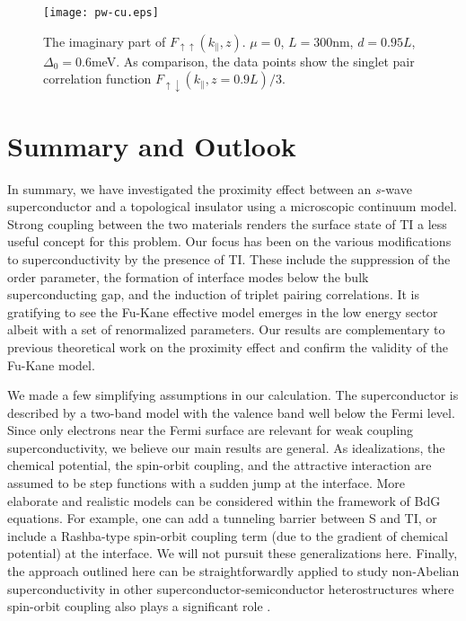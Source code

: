 \documentclass[11pt]{report}
\begin{document}
\begin{figure}
\texttt{[image: pw-cu.eps]}
\caption{The imaginary part of 
$F_{\uparrow\uparrow}(k_\parallel,z)$. $\mu=0$, $L=300$nm, $d=0.95L$, $\Delta_0=0.6$meV.
As comparison, the data points show the singlet pair correlation function 
$F_{\uparrow\downarrow}(k_\parallel,z=0.9L)/3$.
}\label{pw-cu}
\end{figure}

\section{Summary and Outlook}
In summary, we have investigated the proximity effect between an $s$-wave superconductor
and a topological insulator using a microscopic continuum model. 
Strong coupling between the two materials renders the surface state of TI a less 
useful concept for this problem.
Our focus has been on the various modifications to superconductivity by the presence of TI. 
These include the suppression of the order parameter, the formation of interface modes
below the bulk superconducting gap, and the induction of triplet pairing correlations.
It is gratifying to see the Fu-Kane effective model emerges in the low energy sector
albeit with a set of renormalized parameters. Our results are complementary to
previous theoretical work on the proximity effect \cite{f-k,stan} and confirm the validity
of the Fu-Kane model.

We made a few simplifying assumptions in our calculation. The superconductor is described 
by a two-band model with the valence band well below the Fermi level. Since only 
electrons near the Fermi surface are relevant for weak coupling superconductivity, we 
believe our main results are general. As idealizations, the chemical 
potential, the spin-orbit coupling, and the attractive interaction are assumed to be 
step functions with a sudden jump at the interface. 
More elaborate and realistic models can be considered within the framework of BdG equations.
For example, one can add a tunneling barrier between S and TI, 
or include a Rashba-type spin-orbit coupling term 
(due to the gradient of chemical potential) at the interface. We will not 
pursuit these generalizations here.
Finally, the approach outlined here can be straightforwardly applied to 
study non-Abelian superconductivity in other superconductor-semiconductor
heterostructures where spin-orbit coupling also plays a significant role
\cite{roman,maryland,jason,mao1,mao2}.
\end{document}
